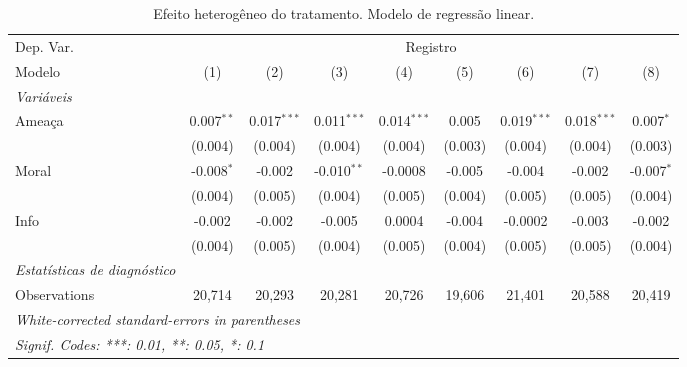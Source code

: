 \begin{table}[htbp]\centering
\caption{\label{tab:tabc1} Efeito heterogêneo do tratamento. Modelo de regressão linear.}
\begin{tabular}{lcccccccc}
\tabularnewline\toprule\toprule
Dep. Var.&\multicolumn{8}{c}{Registro}\\
Modelo&(1) & (2) & (3) & (4) & (5) & (6) & (7) & (8)\\
\midrule
\emph{Variáveis}&  & & & & & & & \\
Ameaça&0.007$^{**}$&0.017$^{***}$&0.011$^{***}$&0.014$^{***}$&0.005&0.019$^{***}$&0.018$^{***}$&0.007$^{*}$\\
  &(0.004)&(0.004)&(0.004)&(0.004)&(0.003)&(0.004)&(0.004)&(0.003)\\
Moral&-0.008$^{*}$&-0.002&-0.010$^{**}$&-0.0008&-0.005&-0.004&-0.002&-0.007$^{*}$\\
  &(0.004)&(0.005)&(0.004)&(0.005)&(0.004)&(0.005)&(0.005)&(0.004)\\
Info&-0.002&-0.002&-0.005&0.0004&-0.004&-0.0002&-0.003&-0.002\\
  &(0.004)&(0.005)&(0.004)&(0.005)&(0.004)&(0.005)&(0.005)&(0.004)\\
\midrule
\emph{Estatísticas de diagnóstico}&  & & & & & & & \\
Observations& 20,714&20,293&20,281&20,726&19,606&21,401&20,588&20,419\\
\bottomrule\bottomrule
\multicolumn{9}{l}{\emph{White-corrected standard-errors in parentheses}}\\
\multicolumn{9}{l}{\emph{Signif. Codes: ***: 0.01, **: 0.05, *: 0.1}}\\
\end{tabular}
\end{table}